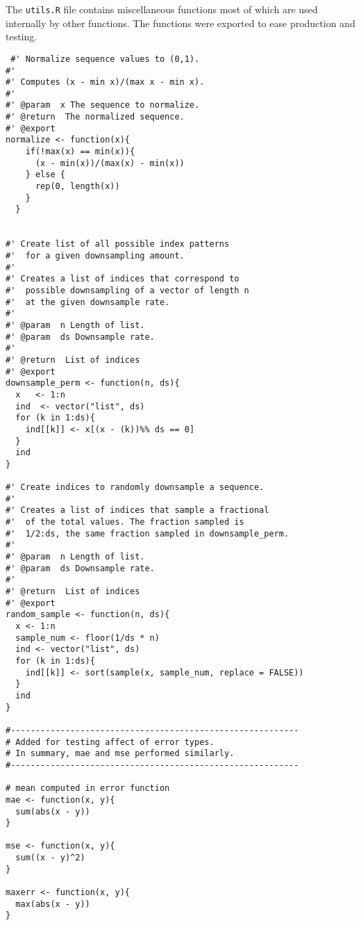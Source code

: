 The \texttt{utils.R} file contains miscellaneous functions most 
of which are used internally by other functions. The functions were
exported to ease production and testing.

\begin{verbatim}
 #' Normalize sequence values to (0,1).
#'
#' Computes (x - min x)/(max x - min x).
#'
#' @param  x The sequence to normalize.
#' @return  The normalized sequence.
#' @export
normalize <- function(x){
    if(!max(x) == min(x)){
      (x - min(x))/(max(x) - min(x)) 
    } else {
      rep(0, length(x))
    }
  }


#' Create list of all possible index patterns 
#'  for a given downsampling amount.
#' 
#' Creates a list of indices that correspond to 
#'  possible downsampling of a vector of length n
#'  at the given downsample rate.
#'
#' @param  n Length of list.
#' @param  ds Downsample rate.
#'
#' @return  List of indices 
#' @export
downsample_perm <- function(n, ds){
  x   <- 1:n
  ind  <- vector("list", ds)    
  for (k in 1:ds){
    ind[[k]] <- x[(x - (k))%% ds == 0] 
  }
  ind
}

#' Create indices to randomly downsample a sequence.
#' 
#' Creates a list of indices that sample a fractional
#'  of the total values. The fraction sampled is
#'  1/2:ds, the same fraction sampled in downsample_perm.
#'
#' @param  n Length of list.
#' @param  ds Downsample rate.
#'
#' @return  List of indices 
#' @export
random_sample <- function(n, ds){
  x <- 1:n
  sample_num <- floor(1/ds * n)
  ind <- vector("list", ds)
  for (k in 1:ds){
    ind[[k]] <- sort(sample(x, sample_num, replace = FALSE))
  }
  ind
}

#----------------------------------------------------------
# Added for testing affect of error types. 
# In summary, mae and mse performed similarly.
#----------------------------------------------------------

# mean computed in error function
mae <- function(x, y){
  sum(abs(x - y))
}

mse <- function(x, y){
  sum((x - y)^2)
}

maxerr <- function(x, y){
  max(abs(x - y))
}

 
\end{verbatim}
